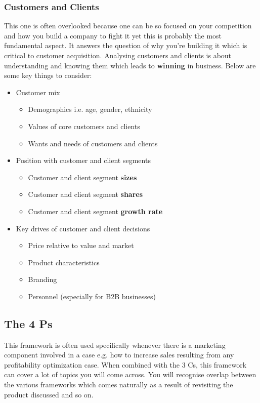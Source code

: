 \documentclass[a4paper]{article}
\begin{document}
{\subsubsection{Customers and Clients}
This one is often overlooked because one can be so focused on your competition and how you build a company to fight it yet this is probably the most fundamental aspect. It answers the question of why you're building it which is critical to customer acquisition. Analysing customers and clients is about understanding and knowing them which leads to \textbf{winning} in business. Below are some key things to consider:

\begin{itemize}
	\item Customer mix
		\begin{itemize}
			\item Demographics i.e. age, gender, ethnicity
			\item Values of core customers and clients
			\item Wants and needs of customers and clients
		\end{itemize}
	\item Position with customer and client segments
		\begin{itemize}
			\item Customer and client segment \textbf{sizes}
			\item Customer and client segment \textbf{shares}
			\item Customer and client segment \textbf{growth rate}
		\end{itemize}
	\item Key drives of customer and client decisions
		\begin{itemize}
			\item Price relative to value and market
			\item Product characteristics
			\item Branding
			\item Personnel (especially for B2B businesses)
		\end{itemize}
\end{itemize}

\subsection{The 4 Ps}
This framework is often used specifically whenever there is a marketing component involved in a case e.g. how to increase sales resulting from any profitability optimization case. When combined with the 3 Cs, this framework can cover a lot of topics you will come across. You will recognise overlap between the various frameworks which comes naturally as a result of revisiting the product discussed and so on.

}
\end{document}
